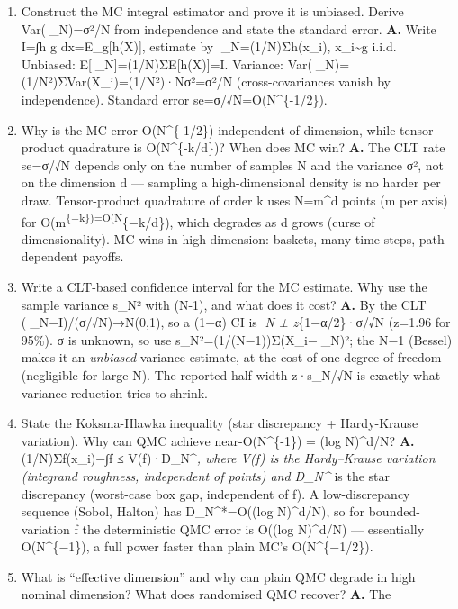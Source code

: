 \documentclass[
  11pt,
]{article}
\providecommand{\tightlist}{%
  \setlength{\itemsep}{0pt}\setlength{\parskip}{0pt}}
\begin{document}
\begin{enumerate}
\def\labelenumi{\arabic{enumi}.}
\tightlist
\item
  Construct the MC integral estimator and prove it is unbiased. Derive
  Var(\_N)=σ²/N from independence and state the standard error.
  \textbf{A.} Write I=∫h g dx=E\_g{[}h(X){]}, estimate by
  \_N=(1/N)Σh(x\_i), x\_i\textasciitilde g i.i.d. Unbiased:
  E{[}\_N{]}=(1/N)ΣE{[}h(X){]}=I. Variance:
  Var(\_N)=(1/N²)ΣVar(X\_i)=(1/N²)·Nσ²=σ²/N (cross-covariances vanish
  by independence). Standard error se=σ/√N=O(N\^{}\{-1/2\}).
\item
  Why is the MC error O(N\^{}\{-1/2\}) independent of dimension, while
  tensor-product quadrature is O(N\^{}\{-k/d\})? When does MC win?
  \textbf{A.} The CLT rate se=σ/√N depends only on the number of samples
  N and the variance σ², not on the dimension d --- sampling a
  high-dimensional density is no harder per draw. Tensor-product
  quadrature of order k uses N=m\^{}d points (m per axis) for
  O(m\textsuperscript{\{−k\})=O(N}\{−k/d\}), which degrades as d grows
  (curse of dimensionality). MC wins in high dimension: baskets, many
  time steps, path-dependent payoffs.
\item
  Write a CLT-based confidence interval for the MC estimate. Why use the
  sample variance s\_N² with (N-1), and what does it cost? \textbf{A.}
  By the CLT (\_N−I)/(σ/√N)→N(0,1), so a (1−α) CI is \emph{N ±
  z}\{1−α/2\}·σ/√N (z=1.96 for 95\%). σ is unknown, so use
  s\_N²=(1/(N−1))Σ(X\_i−\_N)²; the N−1 (Bessel) makes it an
  \emph{unbiased} variance estimate, at the cost of one degree of
  freedom (negligible for large N). The reported half-width z·s\_N/√N is
  exactly what variance reduction tries to shrink.
\item
  State the Koksma-Hlawka inequality (star discrepancy + Hardy-Krause
  variation). Why can QMC achieve near-O(N\^{}\{-1\}) = (log N)\^{}d/N?
  \textbf{A.} \textbar(1/N)Σf(x\_i)−∫f\textbar{} ≤ V(f)·D\_N\^{}\emph{,
  where V(f) is the Hardy--Krause variation (integrand roughness,
  independent of points) and D\_N\^{}} is the star discrepancy
  (worst-case box gap, independent of f). A low-discrepancy sequence
  (Sobol, Halton) has D\_N\^{}*=O((log N)\^{}d/N), so for
  bounded-variation f the deterministic QMC error is O((log N)\^{}d/N)
  --- essentially O(N\^{}\{−1\}), a full power faster than plain MC's
  O(N\^{}\{−1/2\}).
\item
  What is ``effective dimension'' and why can plain QMC degrade in high
  nominal dimension? What does randomised QMC recover? \textbf{A.} The

\end{enumerate}
\end{document}
